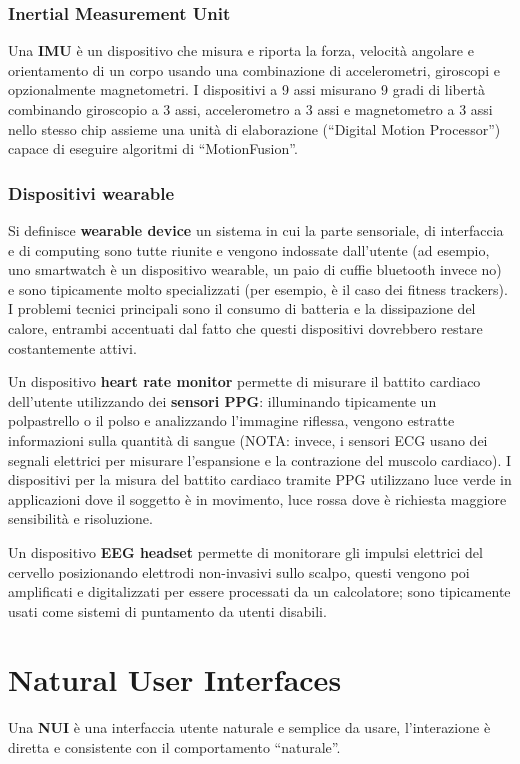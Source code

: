 \subsubsection*{Inertial Measurement Unit}
Una \textbf{IMU} è un dispositivo che misura e riporta la forza, velocità angolare e orientamento di un corpo usando una combinazione di accelerometri,
giroscopi e opzionalmente magnetometri. I dispositivi a 9 assi misurano 9 gradi di libertà combinando giroscopio a 3 assi, accelerometro a 3 assi
e magnetometro a 3 assi nello stesso chip assieme una unità di elaborazione (``Digital Motion Processor'') capace di eseguire algoritmi
di ``MotionFusion''.

\subsubsection*{Dispositivi wearable}
Si definisce \textbf{wearable device} un sistema in cui la parte sensoriale, di interfaccia e di computing sono tutte riunite e vengono indossate
dall'utente (ad esempio, uno smartwatch è un dispositivo wearable, un paio di cuffie bluetooth invece no) e sono tipicamente molto specializzati
(per esempio, è il caso dei fitness trackers). I problemi tecnici principali sono il consumo di batteria e la dissipazione del calore, entrambi accentuati
dal fatto che questi dispositivi dovrebbero restare costantemente attivi.

Un dispositivo \textbf{heart rate monitor} permette di misurare il battito cardiaco dell'utente utilizzando dei \textbf{sensori PPG}: illuminando
tipicamente un polpastrello o il polso e analizzando l'immagine riflessa, vengono estratte informazioni sulla quantità di sangue
(NOTA: invece, i sensori ECG usano dei segnali elettrici per misurare l'espansione e la contrazione del muscolo cardiaco).
I dispositivi per la misura del battito cardiaco tramite PPG utilizzano luce verde in applicazioni dove il soggetto è in movimento,
luce rossa dove è richiesta maggiore sensibilità e risoluzione.

Un dispositivo \textbf{EEG headset} permette di monitorare gli impulsi elettrici del cervello posizionando elettrodi non-invasivi sullo scalpo, questi
vengono poi amplificati e digitalizzati per essere processati da un calcolatore; sono tipicamente usati come sistemi di puntamento da utenti disabili.

\section{Natural User Interfaces}
Una \textbf{NUI} è una interfaccia utente naturale e semplice da usare, l'interazione è diretta e consistente con il comportamento ``naturale''.

